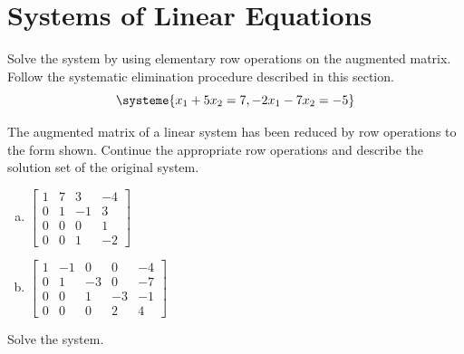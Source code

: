 \section{Systems of Linear Equations}
\name


\begin{exercise} %
	Solve the system by using elementary row operations on the augmented matrix. Follow the systematic elimination procedure described in this section.
	\[
	\systeme{
		x_1	+ 5x_2 =  7,
		-2x_1	- 7x_2 = -5}
	\]
\end{exercise}
\vfill


\begin{exercise} %
	The augmented matrix of a linear system has been reduced by row operations to the form shown. Continue the appropriate row operations and describe the solution set of the original system.
	\begin{multicols}{2}
		\begin{enumerate}[(a)]
			\item 
			$\begin{bmatrix}
			1 & 7 &  3 & -4 \\
			0 & 1 & -1 &  3 \\
			0 & 0 &  0 &  1 \\
			0 & 0 &  1 & -2
			\end{bmatrix}$
			\item
			$\begin{bmatrix}
			1 & -1 &  0 &  0 & -4 \\
			0 &  1 & -3 &  0 & -7 \\
			0 &  0 &  1 & -3 & -1 \\
			0 &  0 &  0 &  2 &  4
			\end{bmatrix}$
		\end{enumerate}
	\end{multicols}
\end{exercise}
\vfill


\newpage


\begin{exercise} %
	Solve the system. \\
	
\end{exercise}
\vfill



